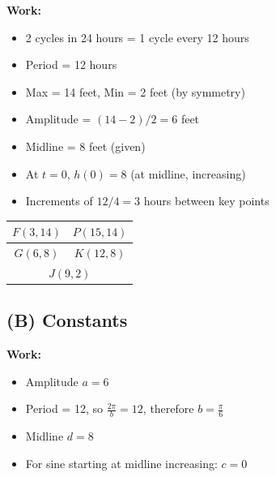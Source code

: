 \documentclass[11pt]{article}
\begin{document}
\textbf{Work:}
\begin{itemize}[noitemsep]
    \item 2 cycles in 24 hours = 1 cycle every 12 hours
    \item Period = 12 hours
    \item Max = 14 feet, Min = 2 feet (by symmetry)
    \item Amplitude = $(14 - 2)/2 = 6$ feet
    \item Midline = 8 feet (given)
    \item At $t = 0$, $h(0) = 8$ (at midline, increasing)
    \item Increments of $12/4 = 3$ hours between key points
\end{itemize}

\begin{center}
\end{center}

\begin{center}
\begin{tabular}{|c|c|}
\hline
$F(3, 14)$ & $P(15, 14)$ \\
\hline
$G(6, 8)$ & $K(12, 8)$ \\
\hline
\multicolumn{2}{|c|}{$J(9, 2)$} \\
\hline
\end{tabular}
\end{center}

\subsection*{(B) Constants}

\textbf{Work:}
\begin{itemize}[noitemsep]
    \item Amplitude $a = 6$
    \item Period = 12, so $\displaystyle\frac{2\pi}{b} = 12$, therefore $\displaystyle b = \frac{\pi}{6}$
    \item Midline $d = 8$
    \item For sine starting at midline increasing: $c = 0$
\end{itemize}
\end{document}
